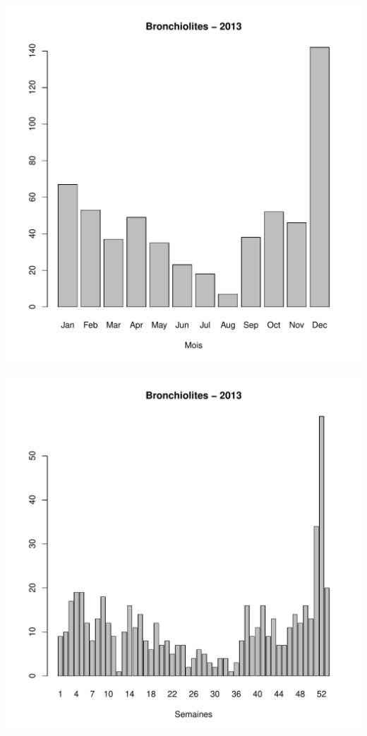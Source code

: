\documentclass[12pt,english,french,twoside]{book}\usepackage[]{graphicx}\usepackage[]{color}
\makeatletter
\def\maxwidth{ %
  \ifdim\Gin@nat@width>\linewidth
    \linewidth
  \else
    \Gin@nat@width
  \fi
}
\newenvironment{knitrout}{}{} %
\makeatother
\begin{document}
\begin{knitrout}
\color{fgcolor}
\includegraphics[width=\maxwidth]{figure/bron1} 

\includegraphics[width=\maxwidth]{figure/bron2} 

\end{knitrout}
\end{document}

